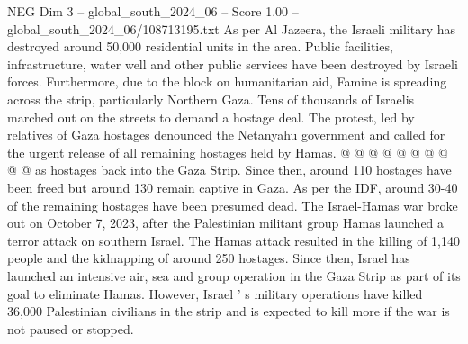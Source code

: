 \begin{textsample}{NEG Dim 3 – global\_south\_2024\_06 – Score 1.00 – global\_south\_2024\_06/108713195.txt}
As per Al Jazeera, the Israeli military has destroyed around 50,000 residential units in the area.
Public facilities, infrastructure, water well and other public services have been destroyed by Israeli forces.
Furthermore, due to the block on humanitarian aid, Famine is spreading across the strip, particularly Northern Gaza.
Tens of thousands of Israelis marched out on the streets to demand a hostage deal.
The protest, led by relatives of Gaza hostages denounced the Netanyahu government and called for the urgent release of all remaining hostages held by Hamas. @ @ @ @ @ @ @ @ @ @ as hostages back into the Gaza Strip.
Since then, around 110 hostages have been freed but around 130 remain captive in Gaza.
As per the IDF, around 30-40 of the remaining hostages have been presumed dead.
The Israel-Hamas war broke out on October 7, 2023, after the Palestinian militant group Hamas launched a terror attack on southern Israel.
The Hamas attack resulted in the killing of 1,140 people and the kidnapping of around 250 hostages.
Since then, Israel has launched an intensive air, sea and group operation in the Gaza Strip as part of its goal to eliminate Hamas.
However, Israel ' s military operations have killed 36,000 Palestinian civilians in the strip and is expected to kill more if the war is not paused or stopped.

\end{textsample}
